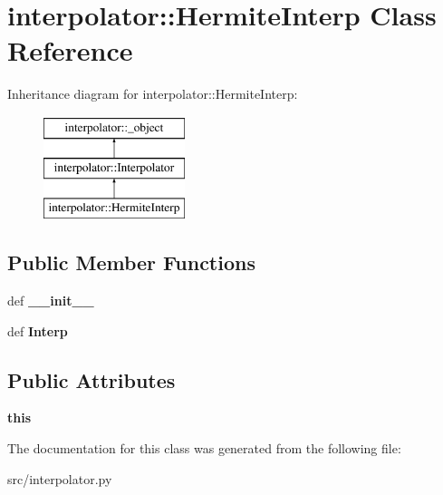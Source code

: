 \hypertarget{classinterpolator_1_1HermiteInterp}{
\section{interpolator::HermiteInterp Class Reference}
\label{db/dc6/classinterpolator_1_1HermiteInterp}
}
Inheritance diagram for interpolator::HermiteInterp:\begin{figure}[H]
\begin{center}
\leavevmode
\includegraphics[height=3cm]{db/dc6/classinterpolator_1_1HermiteInterp}
\end{center}
\end{figure}
\subsection*{Public Member Functions}
\begin{DoxyCompactItemize}
\item 
\hypertarget{classinterpolator_1_1HermiteInterp_a1594626eba5f17c46258c300bbd4c20e}{
def {\bfseries \_\-\_\-init\_\-\_\-}}
\label{db/dc6/classinterpolator_1_1HermiteInterp_a1594626eba5f17c46258c300bbd4c20e}

\item 
\hypertarget{classinterpolator_1_1HermiteInterp_a58621e7cc00225ca1f755c0d1c6e16dd}{
def {\bfseries Interp}}
\label{db/dc6/classinterpolator_1_1HermiteInterp_a58621e7cc00225ca1f755c0d1c6e16dd}

\end{DoxyCompactItemize}
\subsection*{Public Attributes}
\begin{DoxyCompactItemize}
\item 
\hypertarget{classinterpolator_1_1HermiteInterp_af681d0746a0c7c00310b4abb044e99a8}{
{\bfseries this}}
\label{db/dc6/classinterpolator_1_1HermiteInterp_af681d0746a0c7c00310b4abb044e99a8}

\end{DoxyCompactItemize}


The documentation for this class was generated from the following file:\begin{DoxyCompactItemize}
\item 
src/interpolator.py\end{DoxyCompactItemize}
